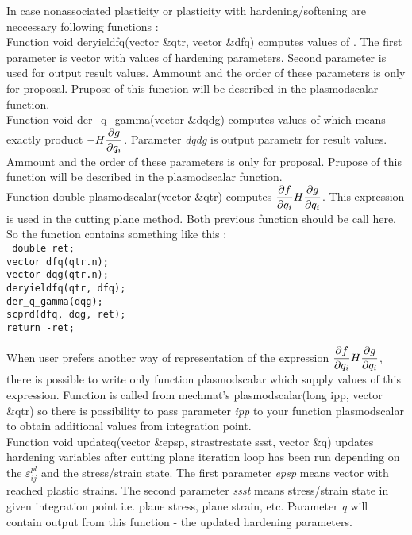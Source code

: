 In case nonassociated plasticity or plasticity with hardening/softening are neccessary following
functions :\\

Function {\sf void deryieldfq(vector \&qtr, vector \&dfq)} computes values of . The first
parameter is vector with values of hardening parameters. Second parameter is used for output result
values. Ammount and the order of these parameters is only for proposal. Prupose of this function will
be described in the {\sf plasmodscalar} function.\\

Function {\sf void der\_q\_gamma(vector \&dqdg)} computes values of  which means
exactly product $-H\mbox{$\displaystyle\frac{\partial{g}}{\partial{q_i}}$}$. Parameter {\it dqdg} is output parametr for result values.
Ammount and the order of these parameters is only for proposal. Prupose of this function will be
described in the {\sf plasmodscalar} function.\\

Function {\sf double plasmodscalar(vector \&qtr)} computes $\mbox{$\displaystyle\frac{\partial{f}}{\partial{q_i}}$}H\mbox{$\displaystyle\frac{\partial{g}}{\partial{q_i}}$}$. This expression
is used in the cutting plane method. Both previous function should be call here. So the function
contains something like this :\\
{\tt
  double ret;\\
  vector dfq(qtr.n);\\
  vector dqg(qtr.n);\\
  deryieldfq(qtr, dfq);\\
  der\_q\_gamma(dqg);\\
  scprd(dfq, dqg, ret);\\
  return -ret;
}

When user prefers another way of representation of the expression $\mbox{$\displaystyle\frac{\partial{f}}{\partial{q_i}}$}H\mbox{$\displaystyle\frac{\partial{g}}{\partial{q_i}}$}$, there
is possible to write only function {\sf plasmodscalar} which supply values of this expression. Function
is called from mechmat's {\sf plasmodscalar(long ipp, vector \&qtr)} so there is possibility to
pass parameter {\it ipp} to your function {\sf plasmodscalar} to obtain additional values from
integration point.\\

Function {\sf void updateq(vector \&epsp, strastrestate ssst, vector \&q)} updates hardening variables after
cutting plane iteration loop has been run depending on the $\varepsilon^{pl}_{ij}$ and the stress/strain state.
The first parameter {\it epsp} means vector with reached plastic strains. The second parameter {\it ssst}
means stress/strain state in given integration point i.e. plane stress, plane strain, etc. Parameter {\it q}
will contain output from this function - the updated hardening parameters.\\

